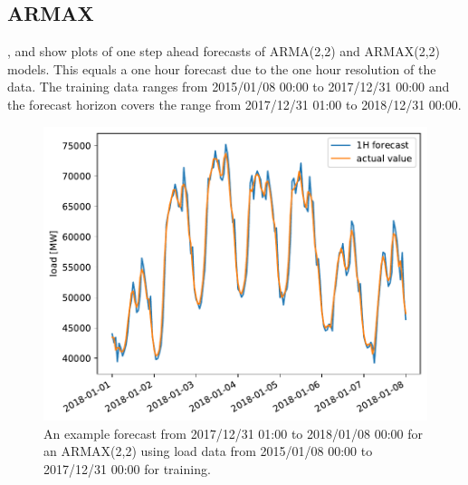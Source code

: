 \subsection*{ARMAX}

,  and  show plots of one step ahead forecasts of ARMA(2,2) and ARMAX(2,2) models. This equals a one hour forecast due to the one hour resolution of the data. The training data ranges from 2015/01/08 00:00 to 2017/12/31 00:00 and the forecast horizon covers the range from 2017/12/31 01:00 to 2018/12/31 00:00.\\

\begin{figure}[h!]%
\centering
\includegraphics[width=\textwidth]{plots/ARMAXfc/ARMAX_p2q2_data2015to2017_fcto2018123100_plot_range2018010100_2018010800}%
\caption{An example forecast from 2017/12/31 01:00 to 2018/01/08 00:00 for an ARMAX(2,2) using load data from 2015/01/08 00:00 to 2017/12/31 00:00 for training.}%
\label{fig:armax_fc}%
\end{figure}

